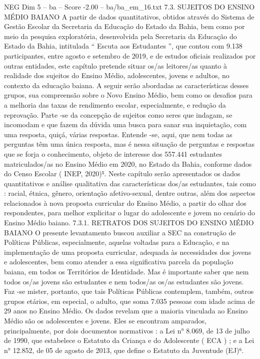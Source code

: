 \begin{textsample}{NEG Dim 5 – ba – Score -2.00 – ba/ba\_em\_16.txt}  \label{ex:f5_neg_012}
7.3.
SUJEITOS DO ENSINO MÉDIO BAIANO A partir de dados quantitativos, obtidos através do Sistema de Gestão Escolar da Secretaria da Educação do Estado da Bahia, bem como por meio da pesquisa exploratória, desenvolvida pela Secretaria da Educação do Estado da Bahia, intitulada “ Escuta aos Estudantes ”, que contou com 9.138 participantes, entre agosto e setembro de 2019, e de estudos oficiais realizados por outras entidades, este capítulo pretende situar os/as leitores/as quanto à realidade dos sujeitos do Ensino Médio, adolescentes, jovens e adultos, no contexto da educação baiana.
A seguir serão abordadas as características desses grupos, sua compreensão sobre o Novo Ensino Médio, bem como os desafios para a melhoria das taxas de rendimento escolar, especialmente, e redução da reprovação.
Parte -se da concepção de sujeitos como seres que indagam, se incomodam e que fazem da dúvida uma busca para sanar sua inquietação, com uma resposta, quiçá, várias respostas.
Entende -se, aqui, que nem todas as perguntas têm uma única resposta, mas é nessa situação de perguntas e respostas que se forja o conhecimento, objeto de interesse dos 557.441 estudantes matriculados/as no Ensino Médio em 2020, no Estado da Bahia, conforme dados do Censo Escolar ( INEP, 2020)⁵.
Neste capítulo serão apresentados os dados quantitativos e análise qualitativa das características dos/as estudantes, tais como : racial, étnica, gênero, orientação afetivo-sexual, dentre outras, além dos aspectos relacionados à nova proposta curricular do Ensino Médio, a partir do olhar dos respondentes, para melhor explicitar o lugar do adolescente e jovem no cenário do Ensino Médio baiano. 7.3.1.
RETRATOS DOS SUJEITOS DO ENSINO MÉDIO BAIANO O presente levantamento buscou auxiliar a SEC na construção de Políticas Públicas, especialmente, aquelas voltadas para a Educação, e na implementação de uma proposta curricular, adequada às necessidades dos jovens e adolescentes, bem como atender a essa significativa parcela da população baiana, em todos os Territórios de Identidade.
Mas é importante saber que nem todos os/as jovens são estudantes e nem todos/as os/as estudantes são jovens.
Faz -se mister, portanto, que tais Políticas Públicas contemplem, também, outros grupos etários, em especial, o adulto, que soma 7.035 pessoas com idade acima de 29 anos no Ensino Médio.
Os dados revelam que a maioria vinculada ao Ensino Médio são os adolescentes e jovens.
Eles se encontram amparados, principalmente, por dois documentos normativos : a Lei n{\EmojiFont °} 8.069, de 13 de julho de 1990, que estabelece o Estatuto da Criança e do Adolescente ( ECA ) ; e a Lei n{\EmojiFont °} 12.852, de 05 de agosto de 2013, que define o Estatuto da Juventude (EJ)⁶.

\end{textsample}
